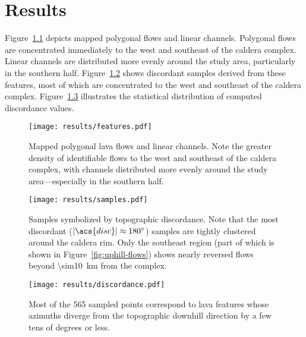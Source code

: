 \chapter{Results}\label{cha:results}

Figure~\ref{fig:features} depicts mapped polygonal flows and linear channels. Polygonal flows are concentrated immediately to the west and southeast of the caldera complex. Linear channels are distributed more evenly around the study area, particularly in the southern half. Figure~\ref{fig:samples} shows discordant samples derived from these features, most of which are concentrated to the west and southeast of the caldera complex. Figure~\ref{fig:discordance} illustrates the statistical distribution of computed discordance values. 

\begin{figure}
    \texttt{[image: results/features.pdf]}%
    \caption[Mapped lava features]{Mapped polygonal lava flows and linear channels. Note the greater density of identifiable flows to the west and southeast of the caldera complex, with channels distributed more evenly around the study area---especially in the southern half.}%
    \label{fig:features}
\end{figure}

\begin{figure}
    \texttt{[image: results/samples.pdf]}%
    \caption[Spatial distribution of discordance]{Samples symbolized by topographic discordance. Note that the most discordant ($|\acs{disc}|\approx\ang{180}$) samples are tightly clustered around the caldera rim. Only the southeast region (part of which is shown in Figure~\ref{fig:uphill-flows}) shows nearly reversed flows beyond \qty{\sim10}{\km} from the complex.}%
    \label{fig:samples}
\end{figure}

\begin{figure}
    \texttt{[image: results/discordance.pdf]}%
    \caption[Statistical distribution of discordance]{Most of the 565 sampled points correspond to lava features whose azimuths diverge from the topographic downhill direction by a few tens of degrees or less.}%
    \label{fig:discordance}
\end{figure}

